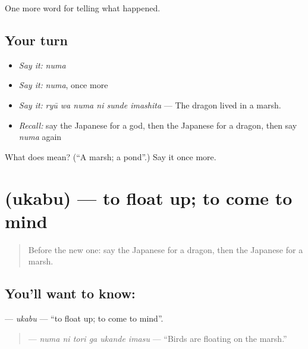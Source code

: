 \begin{grammarlens}[title={What you've built}]
One more word for telling what happened.
\end{grammarlens}

\subsection*{Your turn}
\begin{itemize}
\raggedright
  \item \emph{Say it:} \emph{numa}
  \item \emph{Say it:} \emph{numa}, once more
  \item \emph{Say it:} \emph{ryū wa numa ni sunde imashita} — The dragon lived in a marsh.
  \item \emph{Recall:} say the Japanese for a god, then the Japanese for a dragon, then say \emph{numa} again
\end{itemize}

\begin{tcolorbox}[breakable,colback=teal!4,colframe=teal!35!black,title={Before you move on}]
What does  mean? (\textquotedblleft{}A marsh; a pond\textquotedblright{}.) Say it once more.
\end{tcolorbox}
\section[\texorpdfstring{\ja{うかぶ} (ukabu)}{うかぶ (ukabu)}]{ (ukabu) — to float up; to come to mind}

\label{lesson:JA-C303-ukabu}



\begin{quote}
Before the new one: say the Japanese for a dragon, then the Japanese for a marsh.
\end{quote}

\subsection*{You'll want to know: }
\textbf{} — \emph{ukabu} — \textquotedblleft{}to float up; to come to mind\textquotedblright{}.

\begin{quote}
\textbf{  } — \emph{numa ni tori ga ukande imasu} — \textquotedblleft{}Birds are floating on the marsh.\textquotedblright{}
\end{quote}

